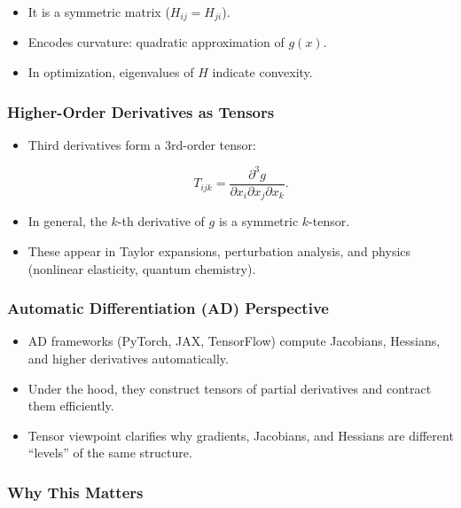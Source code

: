\documentclass[
  letterpaper,
  DIV=11,
  numbers=noendperiod]{scrreprt}
\providecommand{\tightlist}{%
  \setlength{\itemsep}{0pt}\setlength{\parskip}{0pt}}
\begin{document}
\begin{itemize}
\tightlist
\item
  It is a symmetric matrix (\(H_{ij} = H_{ji}\)).
\item
  Encodes curvature: quadratic approximation of \(g(x)\).
\item
  In optimization, eigenvalues of \(H\) indicate convexity.
\end{itemize}

\subsubsection{Higher-Order Derivatives as
Tensors}\label{higher-order-derivatives-as-tensors}

\begin{itemize}
\item
  Third derivatives form a 3rd-order tensor:

  \[
  T_{ijk} = \frac{\partial^3 g}{\partial x_i \partial x_j \partial x_k}.
  \]
\item
  In general, the \(k\)-th derivative of \(g\) is a symmetric
  \(k\)-tensor.
\item
  These appear in Taylor expansions, perturbation analysis, and physics
  (nonlinear elasticity, quantum chemistry).
\end{itemize}

\subsubsection{Automatic Differentiation (AD)
Perspective}\label{automatic-differentiation-ad-perspective}

\begin{itemize}
\tightlist
\item
  AD frameworks (PyTorch, JAX, TensorFlow) compute Jacobians, Hessians,
  and higher derivatives automatically.
\item
  Under the hood, they construct tensors of partial derivatives and
  contract them efficiently.
\item
  Tensor viewpoint clarifies why gradients, Jacobians, and Hessians are
  different ``levels'' of the same structure.
\end{itemize}

\subsubsection{Why This Matters}\label{why-this-matters-42}
\end{document}
